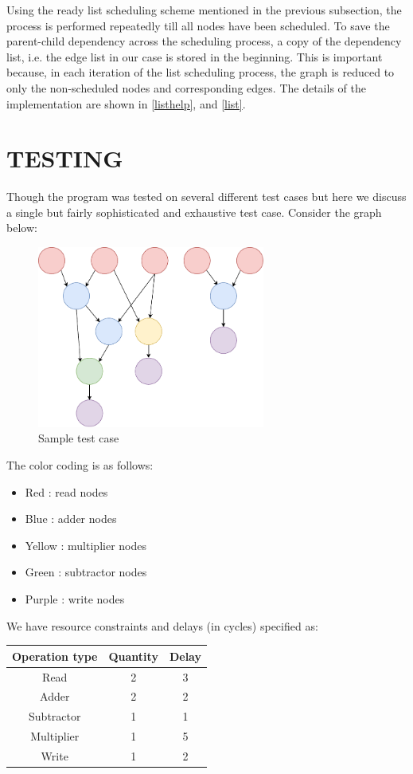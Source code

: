 \documentclass[letterpaper, 10 pt, conference]{ieeeconf}  %
\begin{document}
Using the ready list scheduling scheme mentioned in the previous subsection, the process is performed repeatedly till all nodes have been scheduled. To save the parent-child dependency across the scheduling process, a copy of the dependency list, i.e. the edge list in our case is stored in the beginning. This is important because, in each iteration of the list scheduling process, the graph is reduced to only the non-scheduled nodes and corresponding edges. The details of the implementation are shown in \ref{listhelp}, and \ref{list}.

\section{TESTING}

Though the program was tested on several different test cases but here we discuss a single but fairly sophisticated and exhaustive test case. Consider the graph below:

\begin{figure}[!h]
  \centering
  \includegraphics[width=75mm]{test.pdf}
  \caption{Sample test case}
  \label{fig:connect}
\end{figure}

The color coding is as follows:
\begin{itemize}
    \item Red : read nodes
    \item Blue : adder nodes
    \item Yellow : multiplier nodes
    \item Green : subtractor nodes
    \item Purple : write nodes
\end{itemize}

We have resource constraints and delays (in cycles) specified as:

\begin{center}
\begin{tabular}{ |c|c|c| } 
 \hline
 Operation type & Quantity & Delay \\ 
 \hline \hline
 Read & 2 & 3 \\ 
 \hline
 Adder & 2 & 2 \\ 
 \hline
 Subtractor & 1 & 1\\
 \hline
 Multiplier & 1 & 5\\
 \hline
 Write & 1 & 2\\
 \hline
\end{tabular}
\end{center}
\end{document}
